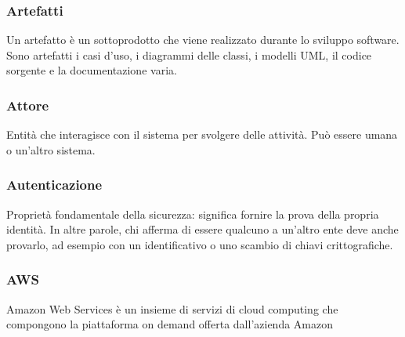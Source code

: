 \subsubsection*{Artefatti}
Un artefatto è un sottoprodotto che viene realizzato durante lo sviluppo software. Sono artefatti i casi d'uso, i diagrammi delle classi, i modelli UML\glo, il codice sorgente e la documentazione varia.

\subsubsection*{Attore}
Entità che interagisce con il sistema per svolgere delle attività. Può essere umana o un'altro sistema.

\subsubsection*{Autenticazione}
Proprietà fondamentale della sicurezza: significa fornire la prova della propria identità. In altre parole, chi afferma di essere qualcuno a un'altro ente deve anche provarlo, ad esempio con un identificativo o uno scambio di chiavi crittografiche.

\subsubsection*{AWS}
Amazon Web Services è un insieme di servizi di cloud computing che compongono la piattaforma on demand offerta dall'azienda Amazon

